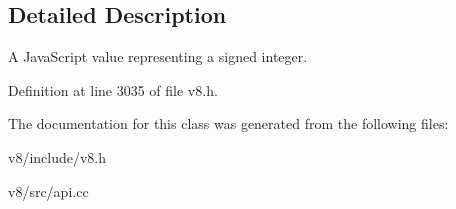 \subsection{Detailed Description}
A Java\+Script value representing a signed integer. 

Definition at line 3035 of file v8.\+h.



The documentation for this class was generated from the following files\+:\begin{DoxyCompactItemize}
\item 
v8/include/v8.\+h\item 
v8/src/api.\+cc\end{DoxyCompactItemize}
